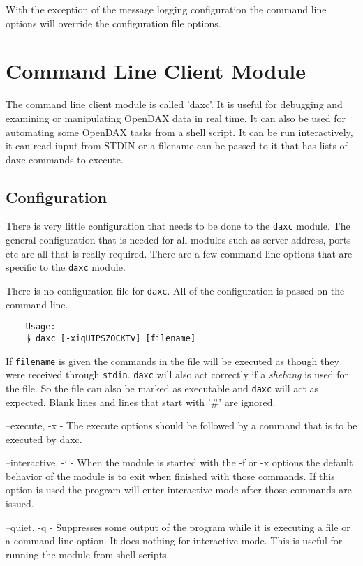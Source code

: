 	With the exception of the message logging configuration the command line options
	will override the configuration file options.

	\chapter{Command Line Client Module}
	The command line client module is called 'daxc'.  It is useful for debugging and
	examining or manipulating OpenDAX data in real time.  It can also be used for
	automating some OpenDAX tasks from a shell script.  It can be run interactively,
	it can read input from STDIN or a filename can be passed to it that has lists of
	daxc commands to execute.

	\section{Configuration}
	There is very little configuration that needs to be done to the \texttt{daxc}
	module.  The general configuration that is needed for all modules such as server
	address, ports etc are all that is really required.  There are a few command
	line options that are specific to the \texttt{daxc} module.

	There is no configuration file for \texttt{daxc}.  All of the configuration is
	passed on the command line.

	\begin{verbatim}
	Usage:
	$ daxc [-xiqUIPSZOCKTv] [filename]
	\end{verbatim}

	If \texttt{filename} is given the commands in the file will be executed as
	though
	they were received through \texttt{stdin}.  \texttt{daxc} will also act
	correctly if a \textit{shebang} is used for the file.  So the file can also be
	marked as executable and \texttt{daxc} will act as expected.  Blank lines and
	lines that start with '\#' are ignored.

	\begin{list}{}{daxc Command Line Options}
		\item[--execute, -x] - The execute options should be followed by a command
		that is to be executed by daxc.
		\item[--interactive, -i] - When the module is started with the -f or -x
		options the default behavior of the module is to exit when finished with those
		commands.  If this option is used the program will enter interactive mode after
		those commands are issued.
		\item[--quiet, -q] - Suppresses some output of the program while it is
		executing a file or a command line option.  It does nothing for interactive
		mode.  This is useful for running the module from shell scripts.
	\end{list}

